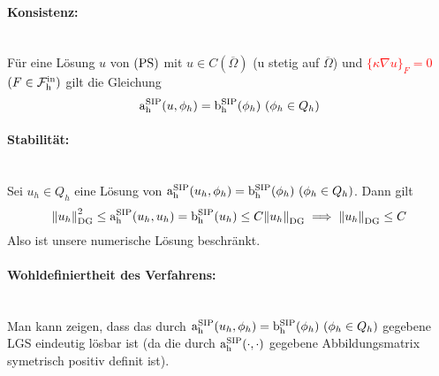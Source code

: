 \paragraph{Konsistenz:}~\\
Für eine Lösung $ u $ von $ \operatorname{(PS)} $ mit $ u \in C(\overline{\Omega}) $ (u stetig auf $ \overline{\Omega} $) und  \textcolor{red}{$ \{\kappa \nabla u\}_F =0$  $(F \in \operatorname{\mathcal{F}_h^{\text{in}}})$}
gilt die Gleichung
\[ \asip(u,\phi_h) = \bsip(\phi_h) \ (\phi_h \in Q_h) \]

\paragraph{Stabilität:}~\\
Sei $ u_h \in Q_h $ eine Lösung von $ \operatorname{a_h^{\text{SIP}}}(u_h, \phi_h) = \operatorname{b_h^{\text{SIP}}}(\phi_h) \ (\phi_h \in Q_h) $. Dann gilt
\[ \norm{u_h}_{\text{DG}}^2 \le \operatorname{a_h^{\text{SIP}}}(u_h, u_h) = \operatorname{b_h^{\text{SIP}}}(u_h) \le C \norm{u_h}_{\text{DG}} \implies \norm{u_h}_{\text{DG}} \le C \]
Also ist unsere numerische Lösung beschränkt. 

\paragraph{Wohldefiniertheit des Verfahrens:}~\\
Man kann zeigen, dass das durch $ \operatorname{a_h^{\text{SIP}}}(u_h, \phi_h) = \operatorname{b_h^{\text{SIP}}}(\phi_h) \ (\phi_h \in Q_h) $ gegebene LGS eindeutig lösbar ist (da die durch $ \operatorname{a_h^{\text{SIP}}}(\cdot, \cdot)  $ gegebene Abbildungsmatrix symetrisch positiv definit ist).